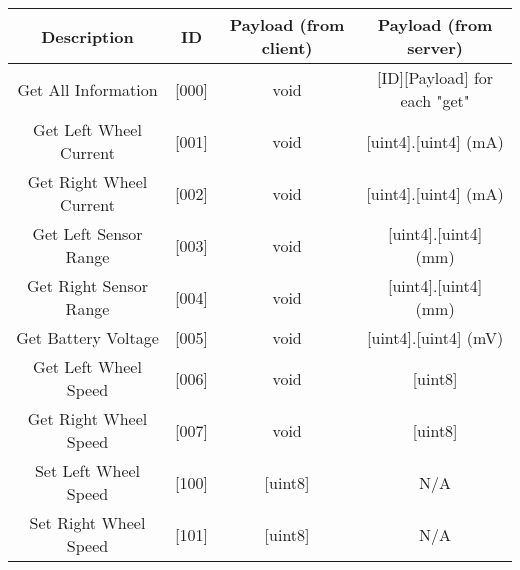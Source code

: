 \begin{table}[!htb]
  \centering
  \renewcommand{\arraystretch}{1.2}
  \begin{tabular}{ |c|c|c|c| }
    \hline
    \textbf{Description}         & \textbf{ID}        & \textbf{Payload (from client)}      & \textbf{Payload (from server)}    \\
    \hline
    Get All Information          & [000]              & void                                & [ID][Payload] for each "get"      \\
    \hline
    Get Left Wheel Current       & [001]              & void                                & [uint4].[uint4] (mA)              \\
    \hline
    Get Right Wheel Current      & [002]              & void                                & [uint4].[uint4] (mA)              \\
    \hline
    Get Left Sensor Range        & [003]              & void                                & [uint4].[uint4] (mm)              \\
    \hline
    Get Right Sensor Range       & [004]              & void                                & [uint4].[uint4] (mm)              \\
    \hline
    Get Battery Voltage          & [005]              & void                                & [uint4].[uint4] (mV)              \\
    \hline
    Get Left Wheel Speed         & [006]              & void                                & [uint8]                           \\
    \hline
    Get Right Wheel Speed        & [007]              & void                                & [uint8]                           \\
    \hline
    Set Left Wheel Speed         & [100]              & [uint8]                             & N/A                               \\
    \hline
    Set Right Wheel Speed        & [101]              & [uint8]                             & N/A                               \\
    \hline
  \end{tabular}
  \caption{}
  \label{tab:protocolMessages}
\end{table}